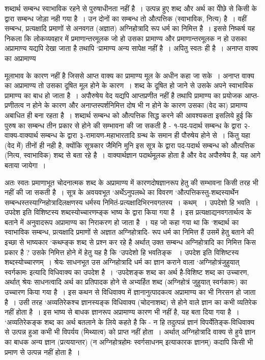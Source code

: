 {शब्दार्थ सम्बन्ध स्वाभाविक रहने से पुरुषाधीनता नहीं है~। उत्पन्न हुए शब्द और अर्थ का पीेछे से किसी के द्वारा सम्बन्ध जोड़ा नही गया है~। उन दोनों का सम्बन्ध तो औत्पत्तिक (स्वाभाविक, नित्य) है~। वहीं सम्बन्ध, प्रत्यक्षादि प्रमाणों से अनवगत (अज्ञात) अग्निहोत्रादि रूप धर्म का निमित्त है~। इससे निष्कर्ष यह निकला कि लोकव्यवहार में प्रमाणान्तरमूलक जो हो उसका प्रामाण्य और प्रमाणान्तरमूलक न हो उसका अप्रामाण्य यद्यपि देखा जाता है तथापि ‘प्रामाण्य अन्य सापेक्ष नहीं है~। अपितु स्वतः ही है~। अनाप्त वाक्य का अप्रामाण्य 

मूलाभाव के कारण नहीं है जिससे आप्त वाक्य का प्रामाण्य मूल के अधीन कहा जा सके~। अनाप्त वाक्य का अप्रामाण्य तो उसका दूषित मूल होने के कारण~। शब्द के दूषित हो जाने से उसके अपने स्वाभाविक प्रामाण्य का बाध हो जाता है~। अपौरुषेय वेद यद्यपि आप्तप्रणीत नहीं है तथापि प्रामाण्य का प्रयोजक आप्त-प्रणीतत्व न होने के कारण और अनाप्तस्पर्शनिमित्त दोष भी न होने के कारण उसका (वेद का) प्रामाण्य अबाधित ही बना रहता है~। शब्दार्थ सम्बन्ध को औत्पत्तिक सिद्ध करने की आवश्यकता इसलिये हुई कि पुरुष का सम्बन्ध तीन प्रकार से होने की सम्भावना की जा सकती है - १-पद-पदार्थ सम्बन्ध के द्वारा २-वाक्य-वाक्यार्थ सम्बन्ध के द्वारा ३-रामायण-महाभारतादि ग्रन्थ के समान ही पौरुषेय होने से~। किंतु यहा (वेद में)  तीनों ही नही है, क्योंकि सूत्रकार जैमिनि मुनि इस सूत्र के द्वारा पद-पदार्थ सम्बन्ध को औत्पत्तिक (नित्य, स्वाभाविक) शब्द से बता रहे है~। वाक्यार्थज्ञान पदार्थमूलक होता है और वेद अपौरुषेय है, यह आगे बताया जायेगा~। 

अतः स्वतः प्रमाणाभूत चोदनात्मक शब्द के अप्रामाण्य में कारणदोषज्ञानरूप हेतु की सम्भावना किसी तरह भी नहीं की जा सकती है~। सूत्र के अवयवभूत ‘अर्थेऽनुपलब्धे का विवरण ‘औत्पत्तिकस्तु-शब्दस्यार्थेन सम्बन्धस्तस्याग्निहोत्रादिलक्षणस्य धर्मस्य निमितं-प्रत्यक्षादिभिरनवगतस्य~। कथम् ~। उपदेशो हि भवति~। उपदेश इति विशिष्टस्य शब्दस्योच्चारणम्ङ्क भाष्य के द्वारा किया गया है~। इस प्रत्यक्षाद्यनवगतार्थत्व के बताने में अनुवादरूप अप्रामाण्य का निराकरण हो जाता है~। यह जो कहा गया था कि ‘शब्दार्थ का स्वाभाविक सम्बन्ध, प्रत्यक्षादि प्रमाणों से अज्ञात अग्निहोत्रादि- रूप धर्म का निमित्त हैं उसमें हेतु बताने की इच्छा से भाष्यकार ‘कथम्ङ्क शब्द से प्रश्न कर रहे है अर्थात् उक्त सम्बन्ध अग्निहोत्रादि का निमित्त किस प्रकार है ? उसके निमित्त होने में हेतु यह है कि ‘उपदेशो हि भवतिङ्क ~। उपदेश इति विशिष्टस्य शब्दस्योच्चारणम्~। श्रेयः साधनभूत उस अग्निहोत्रादि धर्म का ज्ञान कराने वाला ‘अग्निहोत्रंजुहुयात् स्वर्गकामः इत्यादि विधिवाक्य का उपदेश है~। ‘उपदेशङ्क शब्द का अर्थ है-विशिष्ट शब्द का उच्चारण, अर्थात् श्रेयः साधनत्वादि अर्थ का प्रतिपादक होने से अभ्यर्हित शब्द (अग्निहोत्रं जुहुयात् स्वर्गकामः) का उच्चारण किया गया है~। इस कथन से विधिवाक्य में ज्ञानानुत्पादकत्व अप्रामाण्य का भी निरसन हो जाता है~। उसी तरह ‘अव्यतिरेकश्च ज्ञानस्यङ्क विधिवाक्य (चोदनाशब्द) से होने वाले ज्ञान का कभी व्यतिरेक नहीं होता है~। इस भाष्य से बाधक ज्ञानरूप अप्रामाण्य कारण भी नहीं है, यह बता दिया गया है~। ‘अव्यतिरेकङ्क शब्द का अर्थ बतलाने के लिये कहते है कि - न हि तदुत्पन्नं ज्ञानं विपर्येतिङ्क-विधिवाक्य से उत्पन्न हुआ कभी भी विपर्यय (मिथ्यात्व) को प्राप्त नहीं होता~। अर्थात् अग्निहोत्रादि वाक्य से हुये ज्ञान का बाधक अन्य ज्ञान (प्रत्ययान्तर) (न अग्निहोत्रहोमः स्वर्गसाधनम् इत्याकारक ज्ञानम्) कदापि किसी भी प्रमाण से उत्पन्न नहीं होता है~। 

}

